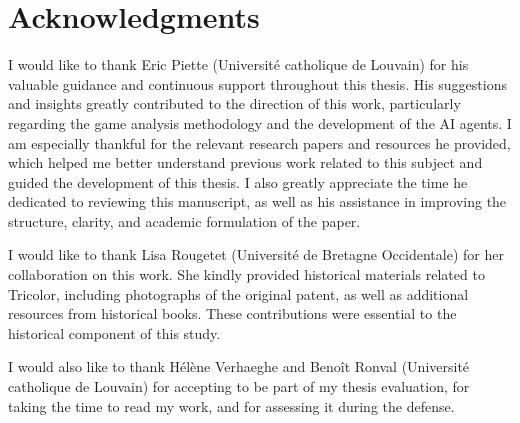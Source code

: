 \chapter*{Acknowledgments}

I would like to thank Eric Piette (Université catholique de Louvain) for his valuable guidance and continuous support throughout this thesis. His suggestions and insights greatly contributed to the direction of this work, particularly regarding the game analysis methodology and the development of the AI agents. I am especially thankful for the relevant research papers and resources he provided, which helped me better understand previous work related to this subject and guided the development of this thesis. I also greatly appreciate the time he dedicated to reviewing this manuscript, as well as his assistance in improving the structure, clarity, and academic formulation of the paper.

I would like to thank Lisa Rougetet (Université de Bretagne Occidentale) for her collaboration on this work. She kindly provided historical materials related to Tricolor, including photographs of the original patent, as well as additional resources from historical books. These contributions were essential to the historical component of this study.

I would also like to thank Hélène Verhaeghe and Benoît Ronval (Université catholique de Louvain) for accepting to be part of my thesis evaluation, for taking the time to read my work, and for assessing it during the defense.